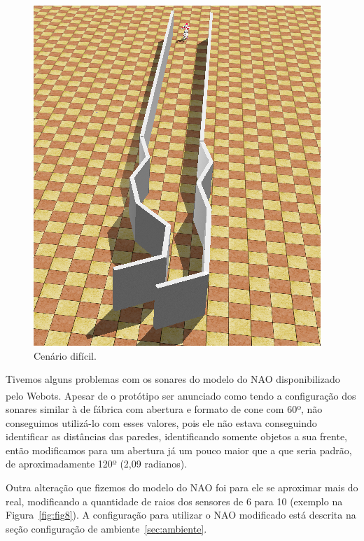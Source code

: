\documentclass[twoside,conference,a4paper]{IEEEtran}
\begin{document}
\begin{figure}[ht]
\centering
\includegraphics[width=1\hsize]{figuras/corredor-dificil-2.png}
\caption{Cenário difícil.}
\label{fig:fig7}
\end{figure}

Tivemos alguns problemas com os sonares do modelo do NAO disponibilizado pelo Webots\textsuperscript{\textregistered}. Apesar de o protótipo ser anunciado como tendo a configuração dos sonares similar à de fábrica com abertura e formato de cone com 60º, não conseguimos utilizá-lo com esses valores, pois ele não estava conseguindo identificar as distâncias das paredes, identificando somente objetos a sua frente, então modificamos para um abertura já um pouco maior que a que seria padrão, de aproximadamente 120º (2,09 radianos).

Outra alteração que fizemos do modelo do NAO foi para ele se aproximar mais do real, modificando a quantidade de raios dos sensores de 6 para 10 (exemplo na Figura~\ref{fig:fig8}).
A configuração para utilizar o NAO modificado está descrita na seção configuração de ambiente~\ref{sec:ambiente}.
\end{document}
